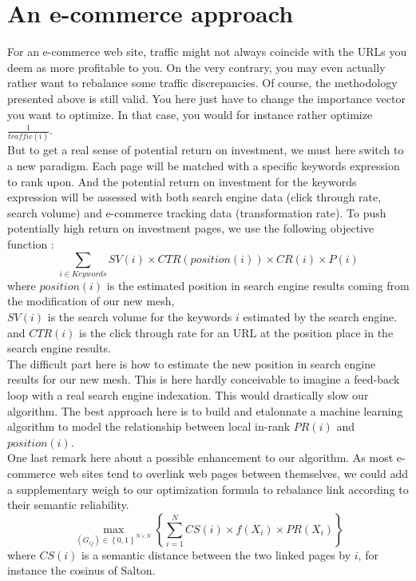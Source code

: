 \documentclass{iSWAGArticle}
\begin{document}
\section{An e-commerce approach}
For an e-commerce web site, traffic might not always coincide with the URLs you deem as more profitable to you.
On the very contrary, you may even actually rather want to rebalance some traffic discrepancies.
Of course, the methodology presented above is still valid. You here just have to change the importance vector you want to
optimize. In that case, you would for instance rather optimize $\frac{1}{traffic\left(i\right)}$.
\\\newline
But to get a real sense of potential return on investment, we must here switch to a new paradigm.
Each page will be matched with a specific keywords expression to rank upon. And the potential return on investment for the keywords expression will
be assessed with both search engine data (click through rate, search volume) and e-commerce tracking data (transformation rate).
To push potentially high return on investment pages, we use the following objective function :
\begin{equation}
 \sum_{i\in Keywords} SV\left( i\right)\times CTR\left(position\left(i\right)\right)\times CR\left(i\right)\times P\left(i\right)
\end{equation}
where $position\left(i\right)$ is the estimated position in search engine results coming from the modification of our new mesh,
\\\newline
$SV\left(i\right)$ is the search volume for the keywords $i$ estimated by the search engine.
\\\newline
and $CTR\left(i\right)$ is the click through rate for an URL at the position place in the search engine results.
\\\newline
The difficult part here is how to estimate the new position in search engine results for our new mesh.
This is here hardly conceivable to imagine a feed-back loop with a real search engine indexation. This would drastically
slow our algorithm. The best approach here is to build and etalonnate a machine learning algorithm to model the relationship between local in-rank $PR\left(i\right)$
and $position(i)$.
\\\newline
One last remark here about a possible enhancement to our algorithm. As most e-commerce web sites tend to overlink web pages between themselves, 
we could add a supplementary weigh to our optimization formula to rebalance link according to their semantic reliability.
\begin{equation}
\max_{\left(G_{ij}\right)  \in \left\{0,1\right\}^{N\times N}}\left\{ \sum^{N}_{i=1} CS\left(i\right)\times f\left(X_i\right)\times PR(X_i)\right\}
\end{equation}
where $CS(i)$ is a semantic distance between the two linked pages by $i$, for instance the cosinus of Salton. 
\end{document}
